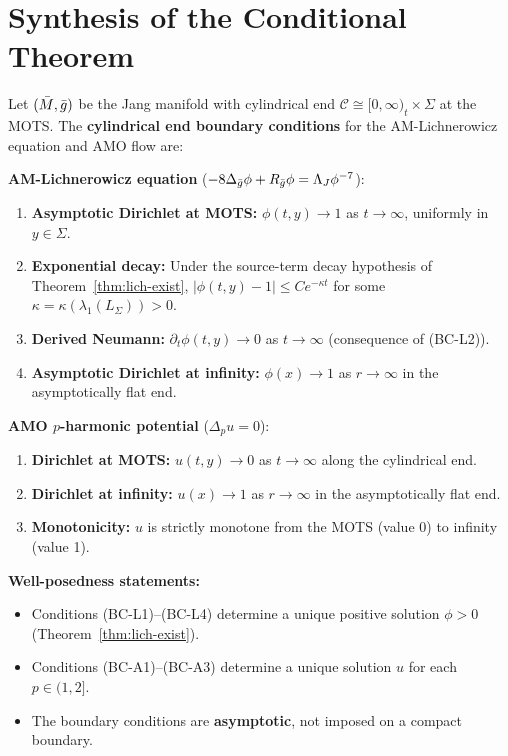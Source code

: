 \section{Synthesis of the Conditional Theorem}\label{sec:synthesis}

\begin{definition}\label{def:cylindrical-bc}
Let $(\bar{M}, \bar{g})$ be the Jang manifold with cylindrical end $\mathcal{C} \cong [0, \infty)_t \times \Sigma$ at the MOTS. The \textbf{cylindrical end boundary conditions} for the AM-Lichnerowicz equation and AMO flow are:

\textbf{AM-Lichnerowicz equation} ($-8\Delta_{\bar{g}}\phi + R_{\bar{g}}\phi = \Lambda_J\phi^{-7}$):
\begin{enumerate}[label=(BC-L\arabic*)]
    \item \textbf{Asymptotic Dirichlet at MOTS:} $\phi(t, y) \to 1$ as $t \to \infty$, uniformly in $y \in \Sigma$.
    \item \textbf{Exponential decay:} Under the source-term decay hypothesis of Theorem~\ref{thm:lich-exist}, $|\phi(t, y) - 1| \leq Ce^{-\kappa t}$ for some $\kappa = \kappa(\lambda_1(L_\Sigma)) > 0$.
    \item \textbf{Derived Neumann:} $\partial_t\phi(t, y) \to 0$ as $t \to \infty$ (consequence of (BC-L2)).
    \item \textbf{Asymptotic Dirichlet at infinity:} $\phi(x) \to 1$ as $r \to \infty$ in the asymptotically flat end.
\end{enumerate}

\textbf{AMO $p$-harmonic potential} ($\Delta_p u = 0$):
\begin{enumerate}[label=(BC-A\arabic*)]
    \item \textbf{Dirichlet at MOTS:} $u(t, y) \to 0$ as $t \to \infty$ along the cylindrical end.
    \item \textbf{Dirichlet at infinity:} $u(x) \to 1$ as $r \to \infty$ in the asymptotically flat end.
    \item \textbf{Monotonicity:} $u$ is strictly monotone from the MOTS (value 0) to infinity (value 1).
\end{enumerate}

\textbf{Well-posedness statements:}
\begin{itemize}
    \item Conditions (BC-L1)--(BC-L4) determine a unique positive solution $\phi > 0$ (Theorem~\ref{thm:lich-exist}).
    \item Conditions (BC-A1)--(BC-A3) determine a unique solution $u$ for each $p \in (1, 2]$.
    \item The boundary conditions are \textbf{asymptotic}, not imposed on a compact boundary.
\end{itemize}
\end{definition}
